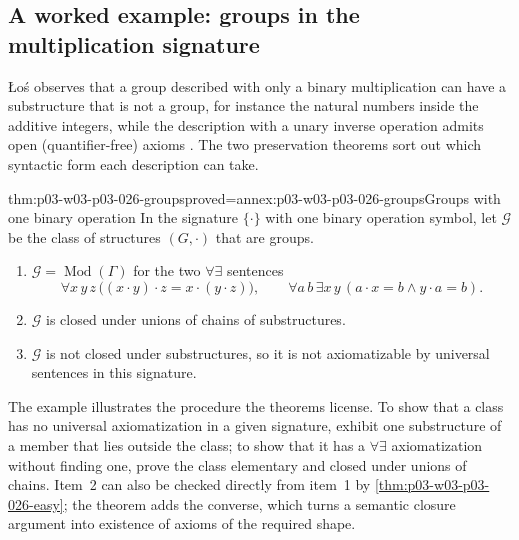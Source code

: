 \subsection{A worked example: groups in the multiplication signature}
\label{sec:p03-w03-p03-026-groups}

\L o\'s observes that a group described with only a binary multiplication
can have a substructure that is not a group, for instance the natural
numbers inside the additive integers, while the description with a unary
inverse operation admits open (quantifier-free) axioms
\cite[p.~47]{Los1955}.  The two preservation theorems sort out which syntactic
form each description can take.

\begin{hbcorollary}{thm:p03-w03-p03-026-groups}{proved=annex:p03-w03-p03-026-groups}{Groups with one binary operation}
In the signature \(\{\cdot\}\) with one binary operation symbol, let
\(\mathcal G\) be the class of structures \((G,\cdot)\) that are groups.
\begin{enumerate}
 \item \(\mathcal G=\operatorname{Mod}(\Gamma)\) for the two
       \(\forall\exists\) sentences
       \[
        \forall x\,y\,z\,\bigl((x\cdot y)\cdot z=x\cdot(y\cdot z)\bigr),
        \qquad
        \forall a\,b\,\exists x\,y\,(a\cdot x=b\land y\cdot a=b).
       \]
 \item \(\mathcal G\) is closed under unions of chains of substructures.
 \item \(\mathcal G\) is not closed under substructures, so it is not
       axiomatizable by universal sentences in this signature.
\end{enumerate}
\end{hbcorollary}

The example illustrates the procedure the theorems license.  To show that a
class has no universal axiomatization in a given signature, exhibit one
substructure of a member that lies outside the class; to show that it has a
\(\forall\exists\) axiomatization without finding one, prove the class
elementary and closed under unions of chains.  Item~2 can also be checked
directly from item~1 by \cref{thm:p03-w03-p03-026-easy}; the theorem adds the
converse, which turns a semantic closure argument into existence of axioms of
the required shape.

